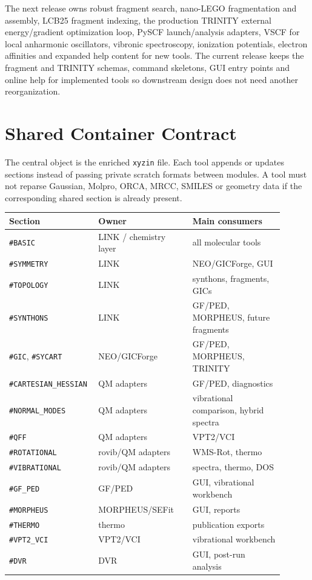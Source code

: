 \documentclass[11pt]{article}
\newcommand{\xyzin}{\texttt{xyzin}}
\newcommand{\sectionname}[1]{\texttt{\##1}}
\begin{document}
The next release owns robust fragment search, nano-LEGO fragmentation and
assembly, LCB25 fragment indexing, the production TRINITY external
energy/gradient optimization loop, PySCF launch/analysis adapters, VSCF for
local anharmonic oscillators, vibronic spectroscopy, ionization potentials,
electron affinities and expanded help content for new tools.  The current
release keeps the fragment and TRINITY schemas, command skeletons, GUI entry
points and online help for implemented tools so downstream design does not need
another reorganization.

\section{Shared Container Contract}

The central object is the enriched \xyzin{} file.  Each tool appends or updates
sections instead of passing private scratch formats between modules.  A tool
must not reparse Gaussian, Molpro, ORCA, MRCC, SMILES or geometry data if the
corresponding shared section is already present.

\begin{longtable}{
  >{\raggedright\arraybackslash}p{0.25\linewidth}
  >{\raggedright\arraybackslash}p{0.33\linewidth}
  >{\raggedright\arraybackslash}p{0.32\linewidth}}
\toprule
Section & Owner & Main consumers \\
\midrule
\sectionname{BASIC} & LINK / chemistry layer & all molecular tools \\
\sectionname{SYMMETRY} & LINK & NEO/GICForge, GUI \\
\sectionname{TOPOLOGY} & LINK & synthons, fragments, GICs \\
\sectionname{SYNTHONS} & LINK & GF/PED, MORPHEUS, future fragments \\
\sectionname{GIC}, \sectionname{SYCART} & NEO/GICForge & GF/PED, MORPHEUS, TRINITY \\
\sectionname{CARTESIAN\_HESSIAN} & QM adapters & GF/PED, diagnostics \\
\sectionname{NORMAL\_MODES} & QM adapters & vibrational comparison, hybrid spectra \\
\sectionname{QFF} & QM adapters & VPT2/VCI \\
\sectionname{ROTATIONAL} & rovib/QM adapters & WMS-Rot, thermo \\
\sectionname{VIBRATIONAL} & rovib/QM adapters & spectra, thermo, DOS \\
\sectionname{GF\_PED} & GF/PED & GUI, vibrational workbench \\
\sectionname{MORPHEUS} & MORPHEUS/SEFit & GUI, reports \\
\sectionname{THERMO} & thermo & publication exports \\
\sectionname{VPT2\_VCI} & VPT2/VCI & vibrational workbench \\
\sectionname{DVR} & DVR & GUI, post-run analysis \\
\bottomrule
\end{longtable}
\end{document}
